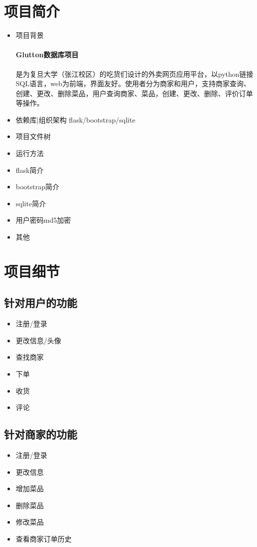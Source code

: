 \documentclass[12pt, oneside,a4paper]{article}
\begin{document}
\section{项目简介}
 \begin{itemize}
  \item 项目背景
  \paragraph {Glutton数据库项目} 是为复旦大学（张江校区）的吃货们设计的外卖网页应用平台，以python链接SQL语言，web为前端，界面友好。使用者分为商家和用户，支持商家查询、创建、更改、删除菜品，用户查询商家、菜品，创建、更改、删除、评价订单等操作。
  \item 依赖库|组织架构
   flask/bootstrap/sqlite
  \item 项目文件树
  \item 运行方法
  \item flask简介
  \item bootstrap简介
  \item sqlite简介
  \item 用户密码md5加密
  \item 其他
 \end{itemize}

\section{项目细节}
 \subsection{针对用户的功能}
  \begin{itemize}
  \item 注册/登录
  \item 更改信息/头像
  \item 查找商家
  \item 下单
  \item 收货
  \item 评论
  \end{itemize}
 \subsection{针对商家的功能}
  \begin{itemize}
  \item 注册/登录
  \item 更改信息
  \item 增加菜品
  \item 删除菜品
  \item 修改菜品
  \item 查看商家订单历史
  \end{itemize}
\end{document}
